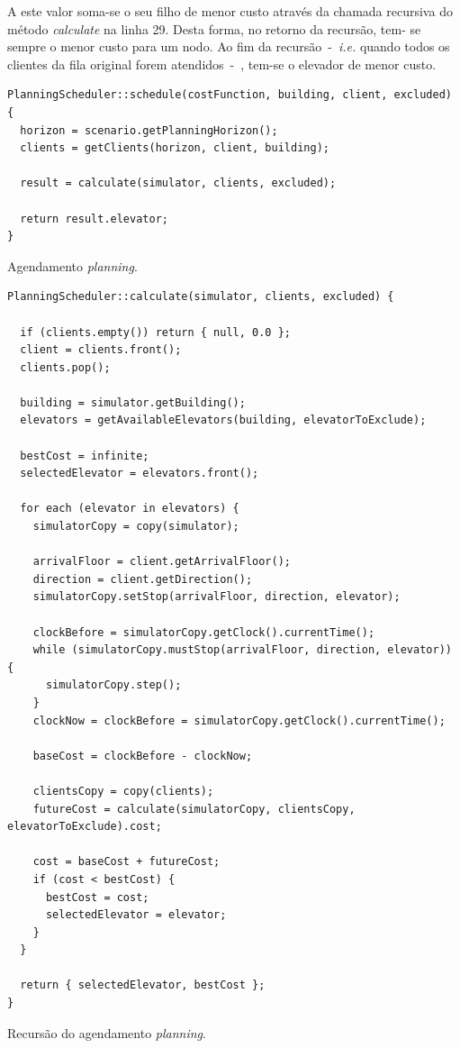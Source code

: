 A este valor soma-se o seu filho de menor custo através da chamada recursiva do
método \textit{calculate} na linha 29. Desta forma, no retorno da recursão, tem-
se sempre o menor custo para um nodo. Ao fim da recursão~-~\textit{i.e.} quando
todos os clientes da fila original forem atendidos~-~, tem-se o elevador de
menor custo.

\begin{algorithm}[htb!]
  \centering
  \begin{verbatim}
PlanningScheduler::schedule(costFunction, building, client, excluded) {
  horizon = scenario.getPlanningHorizon();
  clients = getClients(horizon, client, building);

  result = calculate(simulator, clients, excluded);

  return result.elevator;
}
  \end{verbatim}
  \caption{Agendamento \textit{planning}.}
  \label{alg:scheduler:planning:chamada}
\end{algorithm}

\begin{algorithm}[htb!]
  \centering
  \begin{verbatim}
PlanningScheduler::calculate(simulator, clients, excluded) {

  if (clients.empty()) return { null, 0.0 };
  client = clients.front();
  clients.pop();

  building = simulator.getBuilding();
  elevators = getAvailableElevators(building, elevatorToExclude);

  bestCost = infinite;
  selectedElevator = elevators.front();

  for each (elevator in elevators) {
    simulatorCopy = copy(simulator);

    arrivalFloor = client.getArrivalFloor();
    direction = client.getDirection();
    simulatorCopy.setStop(arrivalFloor, direction, elevator);

    clockBefore = simulatorCopy.getClock().currentTime();
    while (simulatorCopy.mustStop(arrivalFloor, direction, elevator)) {
      simulatorCopy.step();
    }
    clockNow = clockBefore = simulatorCopy.getClock().currentTime();

    baseCost = clockBefore - clockNow;

    clientsCopy = copy(clients);
    futureCost = calculate(simulatorCopy, clientsCopy, elevatorToExclude).cost;

    cost = baseCost + futureCost;
    if (cost < bestCost) {
      bestCost = cost;
      selectedElevator = elevator;
    }
  }

  return { selectedElevator, bestCost };
}
  \end{verbatim}
  \caption{Recursão do agendamento \textit{planning}.}
  \label{alg:scheduler:planning:steps}
\end{algorithm}

